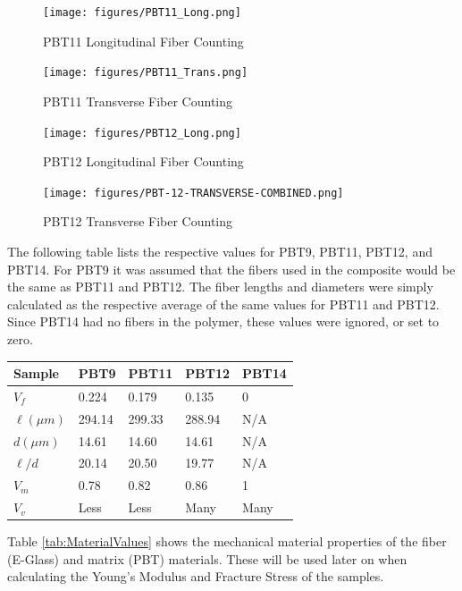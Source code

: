 \documentclass[11pt]{article}
\begin{document}
\begin{figure}[H]
\centering
\texttt{[image: figures/PBT11\_Long.png]}
\caption{PBT11 Longitudinal Fiber Counting}
\label{pbt11longcount}
\end{figure}
\begin{figure}[H]
\centering
\texttt{[image: figures/PBT11\_Trans.png]}
\caption{PBT11 Transverse Fiber Counting}
\label{pbt11transcount}
\end{figure}
\begin{figure}[H]
\centering
\texttt{[image: figures/PBT12\_Long.png]}
\caption{PBT12 Longitudinal Fiber Counting}
\label{pbt12longcount}
\end{figure}
\begin{figure}[H]
\centering
\texttt{[image: figures/PBT-12-TRANSVERSE-COMBINED.png]}
\caption{PBT12 Transverse Fiber Counting}
\label{pbt12transcount}
\end{figure}

The following table lists the respective values for PBT9, PBT11, PBT12, and PBT14. For PBT9 it was assumed that the fibers used in the composite would be the same as PBT11 and PBT12. The fiber lengths and diameters were simply calculated as the respective average of the same values for PBT11 and PBT12.
Since PBT14 had no fibers in the polymer, these values were ignored, or set to zero.
\onehalfspacing
\begin{center}
 \label{tab:MeasuredValues}
\begin{tabular}{p{1.5cm} || p{} | p{} | p{} | p{}}
\hline
Sample & \multicolumn{1}{c|}{PBT9} & \multicolumn{1}{c|}{PBT11} & \multicolumn{1}{c|}{PBT12} & \multicolumn{1}{c}{PBT14} \\
\hline
\hline
\(V_f\) & 0.224 & 0.179 & 0.135 & 0\\
\(\ell (\mu m)\) & 294.14 & 299.33 & 288.94 & N/A\\
\(d (\mu m) \) & 14.61 & 14.60 & 14.61 & N/A\\
\(\ell /d\) & 20.14 & 20.50 & 19.77 & N/A\\
\(V_m\) & 0.78 & 0.82 & 0.86 & 1 \\
\(V_v\) & Less & Less & Many & Many\\
\hline
\end{tabular}
\end{center}
\singlespacing
\vspace{1em}

Table \ref{tab:MaterialValues} shows the mechanical material properties of the fiber (E-Glass) and matrix (PBT) materials. These will be used later on when calculating the Young's Modulus and Fracture Stress of the samples.
\end{document}
